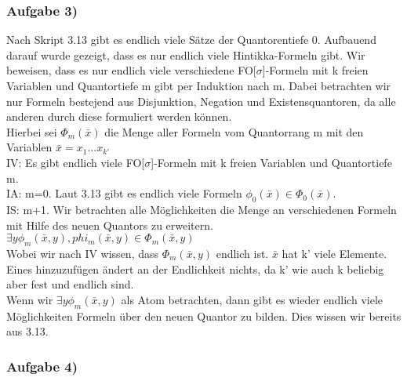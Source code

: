 \documentclass[12pt]{article}
\begin{document}
\subsubsection*{Aufgabe 3)}
Nach Skript 3.13 gibt es endlich viele Sätze der Quantorentiefe 0. Aufbauend darauf wurde gezeigt, dass es nur endlich viele Hintikka-Formeln gibt.
Wir beweisen, dass es nur endlich viele verschiedene FO[$\sigma$]-Formeln mit k freien Variablen und Quantortiefe m gibt per Induktion nach m.
Dabei betrachten wir nur Formeln bestejend aus Disjunktion, Negation und Existensquantoren, da alle anderen durch diese formuliert werden können.\\
Hierbei sei $\Phi_m(\bar x)$ die Menge aller Formeln vom Quantorrang m mit den Variablen $\bar x=x_1 ... x_{k'}$\\

IV: Es gibt endlich viele FO[$\sigma$]-Formeln mit k freien Variablen und Quantortiefe m.\\
IA: m=0. Laut 3.13 gibt es endlich viele Formeln $\phi_0(\bar x) \in \Phi_0(\bar x)$.\\
IS: m+1. Wir betrachten alle Möglichkeiten die Menge an verschiedenen Formeln mit Hilfe des neuen Quantors zu erweitern.\\
$\exists y \phi_m(\bar x, y),  phi_m(\bar x, y) \in \Phi_m(\bar x, y)$\\
  Wobei wir nach IV wissen, dass $\Phi_m(\bar x, y)$ endlich ist. $\bar x$ hat k' viele Elemente. Eines hinzuzufügen ändert an der Endlichkeit nichts, da k' wie auch k beliebig aber fest und endlich sind. \\
Wenn wir $\exists y \phi_m(\bar x, y)$ als Atom betrachten, dann gibt es wieder endlich viele Möglichkeiten Formeln über den neuen Quantor zu bilden. Dies wissen wir bereits aus 3.13.


\subsubsection*{Aufgabe 4)}
 
\end{document}
